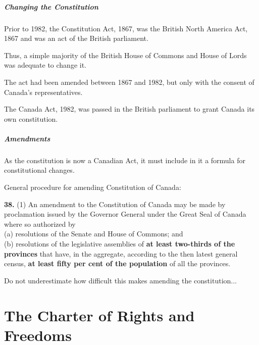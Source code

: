 \begin{frame}
\frametitle{Changing the Constitution}
Prior to 1982, the Constitution Act, 1867, was the British North America Act, 1867 and was an act of the British parliament.

Thus, a simple majority of the British House of Commons and House of Lords was adequate to change it.

The act had been amended between 1867 and 1982, but only with the consent of Canada's representatives.

The Canada Act, 1982, was passed in the British parliament to grant Canada its own constitution.

\end{frame}



\begin{frame}
\frametitle{Amendments}

As the constitution is now a Canadian Act, it must include in it a formula for constitutional changes.

General procedure for amending Constitution of Canada:

\textbf{38.} (1)	An amendment to the Constitution of Canada may be 
		made by proclamation issued by the Governor General 
		under the Great Seal of Canada where so authorized by\\
\quad			(a)	resolutions of the Senate and House of Commons; and\\
\quad		(b)	resolutions of the legislative assemblies of \textbf{at least
			two-thirds of the provinces} that have, in the 
			aggregate, according to the then latest general census,
			\textbf{at least fifty per cent of the population} of all the 
			provinces.

Do not underestimate how difficult this makes amending the constitution...

\end{frame}

\part{The Charter of Rights and Freedoms}



\begin{frame}
\partpage
\end{frame}



